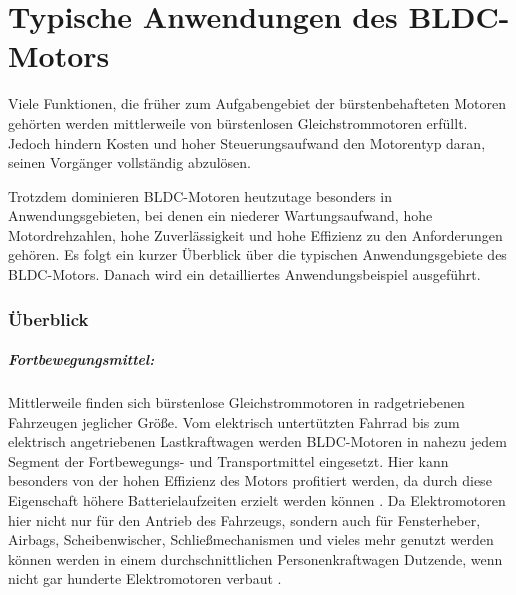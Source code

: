 \chapter{Typische Anwendungen des BLDC-Motors}

Viele Funktionen, die früher zum Aufgabengebiet der bürstenbehafteten Motoren gehörten werden mittlerweile von bürstenlosen Gleichstrommotoren erfüllt. Jedoch hindern Kosten und hoher Steuerungsaufwand den Motorentyp daran, seinen Vorgänger vollständig abzulösen.

Trotzdem dominieren BLDC-Motoren heutzutage besonders in Anwendungsgebieten, bei denen ein niederer Wartungsaufwand, hohe Motordrehzahlen, hohe Zuverlässigkeit und hohe Effizienz zu den Anforderungen gehören. Es folgt ein kurzer Überblick über die typischen Anwendungsgebiete des BLDC-Motors. Danach wird ein detailliertes Anwendungsbeispiel ausgeführt.

\subsection{Überblick}

\paragraph{Fortbewegungsmittel:} Mittlerweile finden sich bürstenlose Gleichstrommotoren in radgetriebenen Fahrzeugen jeglicher Größe. Vom elektrisch untertützten Fahrrad \parencite[vgl.][S.6]{Xia2012} bis zum elektrisch angetriebenen Lastkraftwagen werden BLDC-Motoren in nahezu jedem Segment der Fortbewegungs- und Transportmittel eingesetzt. Hier kann besonders von der hohen Effizienz des Motors profitiert werden, da durch diese Eigenschaft höhere Batterielaufzeiten erzielt werden können \parencite[vgl.][S.4]{Xia2012}. Da Elektromotoren hier nicht nur für den Antrieb des Fahrzeugs, sondern auch für Fensterheber, Airbags, Scheibenwischer, Schließmechanismen und vieles mehr genutzt werden können werden in einem durchschnittlichen Personenkraftwagen Dutzende, wenn nicht gar hunderte Elektromotoren verbaut \parencite[vgl.][S.4]{Xia2012}.

